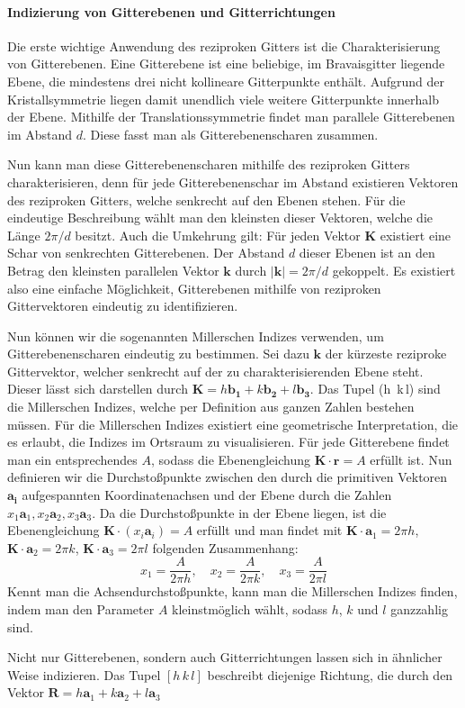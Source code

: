 \paragraph{Indizierung von Gitterebenen und Gitterrichtungen}
Die erste wichtige Anwendung des reziproken Gitters ist die Charakterisierung von Gitterebenen. Eine Gitterebene 
ist eine beliebige, im Bravaisgitter liegende Ebene, die mindestens drei nicht kollineare Gitterpunkte enthält.
Aufgrund der Kristallsymmetrie liegen damit unendlich viele weitere Gitterpunkte innerhalb der Ebene. Mithilfe 
der Translationssymmetrie findet man parallele Gitterebenen im Abstand $d$. Diese fasst man als Gitterebenenscharen 
zusammen.

Nun kann man diese Gitterebenenscharen mithilfe des reziproken Gitters charakterisieren, denn für jede 
Gitterebenenschar im Abstand  existieren Vektoren des reziproken Gitters, welche senkrecht auf den Ebenen stehen. 
Für die eindeutige Beschreibung wählt man den kleinsten dieser Vektoren, welche die Länge $2 \pi / d$ besitzt. Auch
die Umkehrung gilt: Für jeden Vektor $\mathbf{K}$ existiert eine Schar von senkrechten Gitterebenen. 
Der Abstand $d$ dieser Ebenen ist an den Betrag den kleinsten parallelen Vektor $\mathbf{k}$ durch $\lvert \mathbf{k} \rvert=2\pi  /d$ gekoppelt. Es existiert also eine einfache Möglichkeit, Gitterebenen mithilfe von reziproken 
Gittervektoren eindeutig zu identifizieren. \autocite[113]{Ashcroft}

Nun können wir die sogenannten Millerschen Indizes verwenden, um Gitterebenenscharen eindeutig zu bestimmen. Sei 
dazu $\mathbf{k}$  der kürzeste reziproke Gittervektor, welcher senkrecht auf der zu charakterisierenden Ebene steht. Dieser lässt sich darstellen durch $ \mathbf{K} = h \mathbf{b_1} + k \mathbf{b_2} + l \mathbf{b_3}$. Das Tupel (h\, k\,l) sind die Millerschen Indizes, welche per Definition aus ganzen Zahlen 
bestehen müssen. Für die Millerschen Indizes existiert eine geometrische Interpretation, die es erlaubt, die 
Indizes im Ortsraum zu visualisieren. Für jede Gitterebene findet man ein entsprechendes $A$, sodass  die 
Ebenengleichung $\mathbf{K} \cdot \mathbf{r} = A$ erfüllt ist. Nun definieren wir die Durchstoßpunkte zwischen den 
durch die primitiven Vektoren $\mathbf{a_i}$ aufgespannten Koordinatenachsen und der Ebene durch die Zahlen 
$x_{1}\mathbf{a}_{1}, x_{2}\mathbf{a}_{2}, x_{3}\mathbf{a}_{3}$. Da die Durchstoßpunkte in der Ebene liegen, 
ist die Ebenengleichung $\mathbf{K}\cdot(x_{i}\mathbf{a}_{i})=A$ erfüllt und man findet mit $\mathbf{K}\cdot
\mathbf{a}_{1}=2\pi h$, $\mathbf{K}\cdot \mathbf{a}_{2}=2\pi k$,  $ \mathbf{K}\cdot \mathbf{a}_{3}=2\pi l$  
folgenden Zusammenhang:
\begin{equation*}
	x_{1}=\frac{A}{2\pi h}, \quad x_{2}=\frac{A}{2\pi k}, \quad x_{3} =\frac{A}{2\pi l}
\end{equation*}
Kennt man die Achsendurchstoßpunkte, kann man die Millerschen Indizes finden, indem man den Parameter $A$ 
kleinstmöglich wählt, sodass $h$, $k$ und $l$ ganzzahlig sind. \autocite[115]{Ashcroft}

Nicht nur Gitterebenen, sondern auch Gitterrichtungen lassen sich in ähnlicher Weise indizieren. Das Tupel
$[h\,k\,l]$ beschreibt diejenige Richtung, die durch den Vektor $\mathbf{R} = h\mathbf{a}_{1}+k\mathbf{a}_{2}+
l\mathbf{a}_{3}$ 
